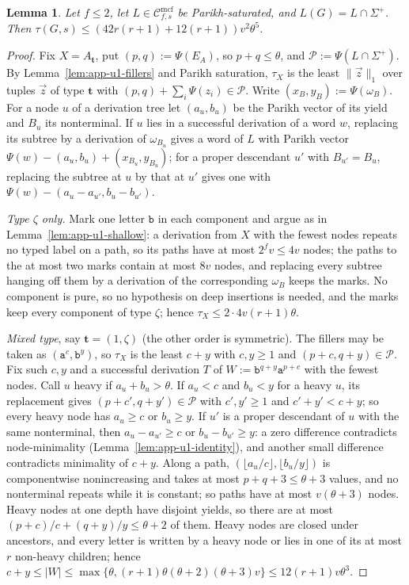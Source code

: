 \documentclass[11pt]{article}
\numberwithin{equation}{section}
\theoremstyle{plain}
\newtheorem{lemma}[theorem]{Lemma}
\theoremstyle{definition}
\theoremstyle{remark}
\newcommand{\Cmcf}[2]{\mathcal{C}^{\mathrm{mcf}}_{#1,#2}}
\newcommand{\tuple}[1]{\vec{#1}}
\theoremstyle{plain}
\begin{document}
\begin{lemma}\label{lem:app-u1-parikh}
Let $f\le2$, let $L\in\Cmcf{f}{s}$ be Parikh-saturated, and
$L(G)=L\cap\Sigma^+$.  Then $\tau(G,s)\le(42r(r+1)+12(r+1))v^2\theta^5$.
\end{lemma}

\begin{proof}
Fix $X=A_{\mathbf t}$, put $(p,q):=\Psi(E_A)$, so $p+q\le\theta$, and
$\mathcal P:=\Psi(L\cap\Sigma^+)$.  By Lemma~\ref{lem:app-u1-fillers} and Parikh
saturation, $\tau_X$ is the least $\|\tuple z\|_1$ over tuples $\tuple z$ of type
$\mathbf t$ with $(p,q)+\sum_i\Psi(z_i)\in\mathcal P$.  Write $(x_B,y_B):=\Psi(\omega_B)$.
For a node $u$ of a derivation tree let $(a_u,b_u)$ be the Parikh vector of its
yield and $B_u$ its nonterminal.  If $u$ lies in a successful derivation of a word
$w$, replacing its subtree by a derivation of $\omega_{B_u}$ gives a word of $L$
with Parikh vector $\Psi(w)-(a_u,b_u)+(x_{B_u},y_{B_u})$; for a proper descendant
$u'$ with $B_{u'}=B_u$, replacing the subtree at $u$ by that at $u'$ gives one
with $\Psi(w)-(a_u-a_{u'},b_u-b_{u'})$.

\emph{Type $\zeta$ only.}  Mark one letter $\mathtt b$ in each component and argue as
in Lemma~\ref{lem:app-u1-shallow}: a derivation from $X$ with the fewest nodes repeats
no typed label on a path, so its paths have at most $2^fv\le4v$ nodes; the paths to
the at most two marks contain at most $8v$ nodes, and replacing every subtree hanging
off them by a derivation of the corresponding $\omega_B$ keeps the marks.  No
component is pure, so no hypothesis on deep insertions is needed, and the marks keep
every component of type $\zeta$; hence $\tau_X\le2\cdot4v(r+1)\theta$.

\emph{Mixed type}, say $\mathbf t=(1,\zeta)$ (the other order is symmetric).  The
fillers may be taken as $(\mathtt a^c,\mathtt b^y)$, so $\tau_X$ is the least $c+y$
with $c,y\ge1$ and $(p+c,q+y)\in\mathcal P$.  Fix such $c,y$ and a successful
derivation $T$ of $W:=\mathtt b^{q+y}\mathtt a^{p+c}$ with the fewest nodes.  Call $u$
heavy if $a_u+b_u>\theta$.  If $a_u<c$ and $b_u<y$ for a heavy $u$, its replacement
gives $(p+c',q+y')\in\mathcal P$ with $c',y'\ge1$ and $c'+y'<c+y$; so every heavy
node has $a_u\ge c$ or $b_u\ge y$.  If $u'$ is a proper descendant of $u$ with the
same nonterminal, then $a_u-a_{u'}\ge c$ or $b_u-b_{u'}\ge y$: a zero difference
contradicts node-minimality (Lemma~\ref{lem:app-u1-identity}), and another small
difference contradicts minimality of $c+y$.  Along a path, $(\lfloor a_u/c\rfloor,
\lfloor b_u/y\rfloor)$ is componentwise nonincreasing and takes at most $p+q+3\le
\theta+3$ values, and no nonterminal repeats while it is constant; so paths have
at most $v(\theta+3)$ nodes.  Heavy nodes at one depth have disjoint yields, so
there are at most $(p+c)/c+(q+y)/y\le\theta+2$ of them.  Heavy nodes are closed
under ancestors, and every letter is written by a heavy node or lies in one of its
at most $r$ non-heavy children; hence
$c+y\le|W|\le\max\{\theta,(r+1)\theta(\theta+2)(\theta+3)v\}\le12(r+1)v\theta^3$.


\end{proof}
\end{document}

